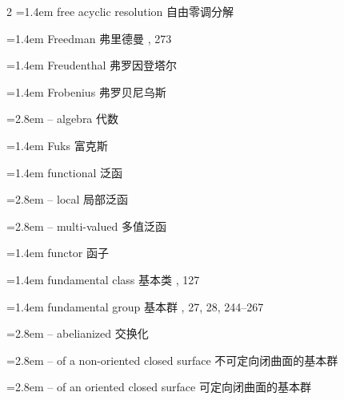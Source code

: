 \begin{multicols}{2}
\noindent\hangindent=1.4em free acyclic resolution \quad 自由零调分解 \par
\noindent\hangindent=1.4em Freedman \quad 弗里德曼 , 273\par
\noindent\hangindent=1.4em Freudenthal \quad 弗罗因登塔尔 \par
\noindent\hangindent=1.4em Frobenius \quad 弗罗贝尼乌斯 \par
\noindent\hangindent=2.8em -- algebra \quad 代数 \par
\noindent\hangindent=1.4em Fuks \quad 富克斯 \par
\noindent\hangindent=1.4em functional \quad 泛函 \quad\par
\noindent\hangindent=2.8em -- local \quad 局部泛函 \par
\noindent\hangindent=2.8em -- multi-valued \quad 多值泛函 \par
\noindent\hangindent=1.4em functor \quad 函子 \par
\noindent\hangindent=1.4em fundamental class \quad 基本类 , 127\par
\noindent\hangindent=1.4em fundamental group \quad 基本群 , 27, 28, 244--267\par
\noindent\hangindent=2.8em -- abelianized \quad 交换化 \par
\noindent\hangindent=2.8em -- of a non-oriented closed surface \quad 不可定向闭曲面的基本群 \par
\noindent\hangindent=2.8em -- of an oriented closed surface \quad 可定向闭曲面的基本群 \par
\end{multicols}

